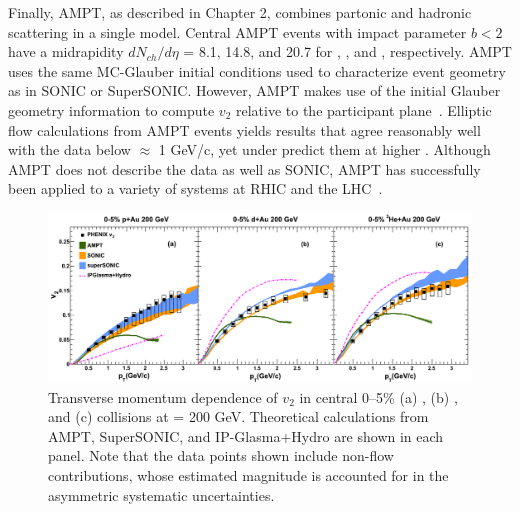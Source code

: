 Finally, AMPT, as described in Chapter 2, combines partonic and hadronic scattering in a single model. Central AMPT events with impact parameter $b<2$ have a midrapidity $dN_{ch}/d\eta$ = 8.1, 14.8, and 20.7 for \pau, \dau, and \hau, respectively. AMPT uses the same MC-Glauber initial conditions used to characterize event geometry as in SONIC or SuperSONIC. However, AMPT makes use of the initial Glauber geometry information to compute $v_2$ relative to the participant plane~\cite{PhysRevC.92.054903}. Elliptic flow calculations from AMPT events yields results that agree reasonably well with the data below \pt $\approx$ 1 GeV/c, yet under predict them at higher \pt. Although AMPT does not describe the data as well as SONIC, AMPT has successfully been applied to a variety of systems at RHIC and the LHC~\cite{PhysRevC.93.054911}. 

\begin{figure}[!ht]
\begin{center}
\includegraphics[width=1.0\linewidth]{figs/indepth_theory_comparison.png}
\caption{Transverse momentum dependence of $v_2$ in central 0--5\% (a) \pau, (b) \dau, and (c) \hau collisions at \sqsn = 200 GeV. Theoretical calculations from AMPT, SuperSONIC, and IP-Glasma+Hydro are shown in each panel. Note that the data points shown include non-flow contributions, whose estimated magnitude is accounted for in the asymmetric systematic uncertainties.}
\label{fig:indepth_comp_three}
\end{center}
\end{figure}

